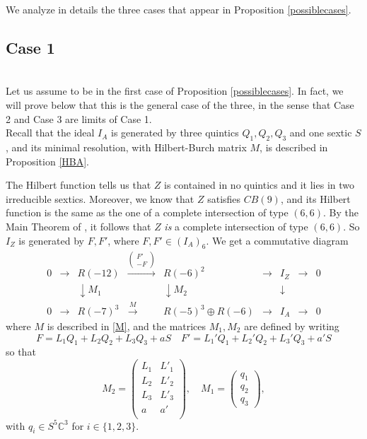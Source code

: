 \documentclass{amsart}
\newcommand{\C}{\mathbb{C}}
\theoremstyle{definition}
\begin{document}
We analyze in details the three cases that appear in Proposition \ref{possiblecases}.

\subsection{Case 1} \quad\\
\noindent Let us assume to be in the first case of Proposition \ref{possiblecases}. In fact, we will prove below that this is the general case of the three,
in the sense that Case 2 and Case 3 are limits of Case 1.\\
Recall that the ideal $I_A$ is generated by three quintics $Q_1,Q_2,Q_3$ and one sextic $S$, and its minimal resolution, with Hilbert-Burch matrix $M$,
is described  in Proposition \ref{HBA}.

The Hilbert function tells us that $Z$ is contained in no quintics and it lies in two irreducible sextics. Moreover, we know that $ Z $ satisfies $ CB(9) $,
 and its Hilbert function is the same as the one of a complete intersection of type $ (6,6) $. By the Main Theorem of \cite{Davis84}, 
 it follows that $ Z $ \emph{is} a complete intersection of type $ (6,6) $. So $ I_{Z}$ is generated by $F,F'$, where $ F,F' \in (I_{A})_6 $.
 We get a commutative diagram
 $$
\begin{matrix}
0 & \longrightarrow & R(-12)                   & \xrightarrow  {\begin{pmatrix} F' \\ -F\end{pmatrix}} &  R(-6)^2                              & \longrightarrow  & I_Z                   &\longrightarrow & 0  \\
   &                            & \downarrow M_1 &                                                                                               & \downarrow    M_2             &                            &  \downarrow   &                          &      \\
0 &\longrightarrow  & R(-7)^3                 & \xrightarrow M                                                                      & R(-5)^3\oplus R(-6)            & \longrightarrow  & I_A                  &\longrightarrow & 0
\end{matrix}
$$
where $ M $ is described in  \eqref{M}, and  the matrices $M_1, M_2$ are defined by writing
$$
F = L_1Q_1 + L_2Q_2 + L_3Q_3 + aS \quad F' = L_1'Q_1 + L_2'Q_2 + L_3'Q_3 + a'S
$$
so that 
$$M_{2} = \begin{pmatrix} L _1&  L'_1 \\  L_2 & L'_2 \\ L_3 & L'_3 \\ a & a' \\ \end{pmatrix}, \quad M_{1} = \begin{pmatrix} q_{1} \\ q_{2} \\ q_{3}  \end{pmatrix},$$
with $ q_{i} \in S^{5} \C^{3} $ for $ i\in \{1,2,3\} $. 
\end{document}
